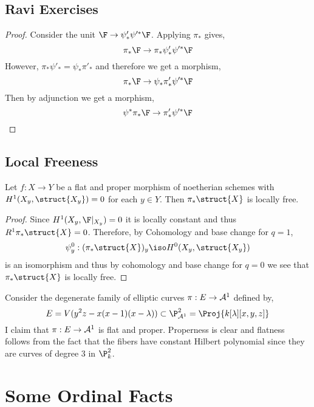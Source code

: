 \documentclass[12pt]{article}
\begin{document}
\subsection{Ravi Exercises}

\begin{prop}[16.3.G.]

\end{prop}

\begin{proof}
Consider the unit $\F \to \psi'_* \psi'^* \F$. Applying $\pi_*$ gives,
\[ \pi_* \F \to \pi_* \psi'_* \psi'^* \F \]
However, $\pi_* \psi'_* = \psi_* \pi'_*$ and therefore we get a morphism,
\[ \pi_* \F \to \psi_* \pi'_* \psi'^* \F \]
Then by adjunction we get a morphism,
\[ \psi^* \pi_* \F \to \pi'_* \psi'^* \F \]
\end{proof}


\subsection{Local Freeness}

\begin{prop}
Let $f : X \to Y$ be a flat and proper morphism of noetherian schemes with $H^1(X_y, \struct{X_y}) = 0$ for each $y \in Y$. Then $\pi_* \struct{X}$ is locally free.
\end{prop}

\begin{proof}
Since $H^1(X_y, \F|_{X_y}) = 0$ it is locally constant and thus $R^1 \pi_* \struct{X} = 0$. Therefore, by Cohomology and base change for $q = 1$, \[ \psi^0_y : (\pi_* \struct{X})_y \iso H^0(X_y, \struct{X_y}) \]
is an isomorphism and thus by cohomology and base change for $q = 0$ we see that $\pi_* \struct{X}$ is locally free.
\end{proof}

\begin{example}
Consider the degenerate family of elliptic curves $\pi : E \to \mathcal{A}^1$ defined by,
\[ E = V(y^2 z - x (x - 1)(x - \lambda)) \subset \P^2_{\A^1} = \Proj{k[\lambda][x,y,z]} \]
I claim that $\pi : E \to \mathcal{A}^1$ is flat and proper. Properness is clear and flatness follows from the fact that the fibers have constant Hilbert polynomial since they are curves of degree $3$ in $\P^2_k$. 
\end{example}

\section{Some Ordinal Facts}
\end{document}
